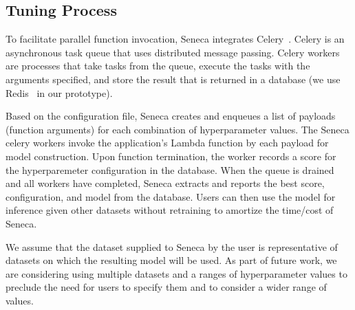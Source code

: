 \subsection{Tuning Process}

To facilitate parallel function invocation, Seneca integrates 
Celery~\cite{ref:celery}.
Celery is an asynchronous task queue 
that uses distributed message passing. Celery workers are processes 
that take tasks from the queue, execute the tasks with the arguments specified, 
and store the result that is returned 
in a database (we use Redis~\cite{ref:redis}
in our prototype). 

Based on the configuration file, Seneca creates and enqueues a list of
payloads (function arguments) for each combination of hyperparameter
values.  The Seneca celery workers invoke the application's Lambda
function by each payload for model construction. Upon function
termination, the worker records a score for the hyperparemeter
configuration in the database.  When the queue is drained and all
workers have completed, Seneca extracts and reports the best score,
configuration, and model from the database. Users can then use the
model for inference given other datasets without retraining to
amortize the time/cost of Seneca.


We assume that the dataset supplied to Seneca by the user is representative of 
datasets on which the 
resulting model will be used.  
As part of future work, we are considering using multiple datasets and a ranges
of hyperparameter values to preclude the need for users to specify
them and to consider a wider range of values.
